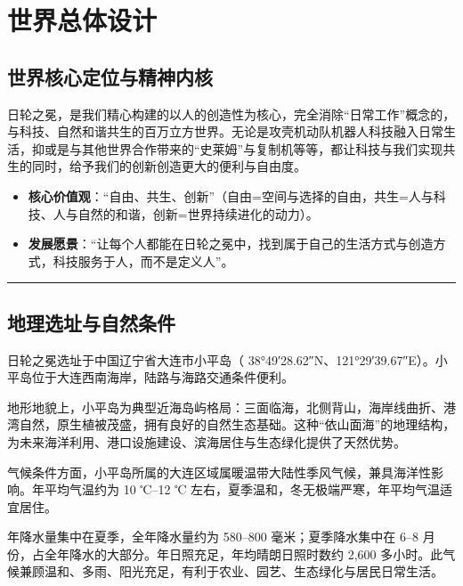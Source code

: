 ﻿\chapter{世界总体设计}\label{ux7b2cux4e00ux7ae0-ux4e16ux754cux603bux4f53ux8bbeux8ba1}

\section{世界核心定位与精神内核}\label{ux4e16ux754cux6838ux5fc3ux5b9aux4f4dux4e0eux7cbeux795eux5185ux6838}

日轮之冕，是我们精心构建的以人的创造性为核心，完全消除``日常工作''概念的，与科技、自然和谐共生的百万立方世界。无论是攻壳机动队机器人科技融入日常生活，抑或是与其他世界合作带来的``史莱姆''与复制机等等，都让科技与我们实现共生的同时，给予我们的创新创造更大的便利与自由度。

\begin{itemize}
\item
  \textbf{核心价值观}：``自由、共生、创新''（自由=空间与选择的自由，共生=人与科技、人与自然的和谐，创新=世界持续进化的动力）。
\item
  \textbf{发展愿景}：``让每个人都能在日轮之冕中，找到属于自己的生活方式与创造方式，科技服务于人，而不是定义人''。
\end{itemize}

\begin{center}\rule{0.5\linewidth}{0.5pt}\end{center}

\section{地理选址与自然条件}\label{ux5730ux7406ux9009ux5740ux4e0eux81eaux7136ux6761ux4ef6}

日轮之冕选址于中国辽宁省大连市小平岛（ 38°49′28.62″N、121°29′39.67″E）。小平岛位于大连西南海岸，陆路与海路交通条件便利。

地形地貌上，小平岛为典型近海岛屿格局：三面临海，北侧背山，海岸线曲折、港湾自然，原生植被茂盛，拥有良好的自然生态基础。这种``依山面海''的地理结构，为未来海洋利用、港口设施建设、滨海居住与生态绿化提供了天然优势。

气候条件方面，小平岛所属的大连区域属暖温带大陆性季风气候，兼具海洋性影响。年平均气温约为 10 ℃--12 ℃ 左右，夏季温和，冬无极端严寒，年平均气温适宜居住。

年降水量集中在夏季，全年降水量约为 580--800 毫米；夏季降水集中在 6--8 月份，占全年降水的大部分。年日照充足，年均晴朗日照时数约 2,600 多小时。此气候兼顾温和、多雨、阳光充足，有利于农业、园艺、生态绿化与居民日常生活。


